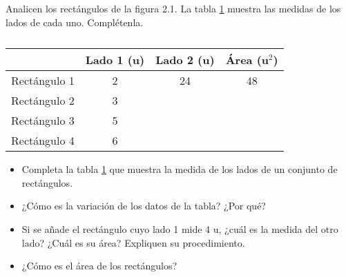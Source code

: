\documentclass{exam-n}
\begin{document}
\begin{questions}
    \question Analicen los rectángulos de la figura 2.1. La tabla \ref{tab:rectangulos} muestra las medidas de los lados de cada uno. Complétenla.
    \begin{table}[!h]
        \label{tab:rectangulos}
        \centering
        \begin{tabular}{|l|c|c|c|}
            \hline
                         & Lado 1 (u) & Lado 2 (u) & Área (u$^2$) \\
            \hline
            Rectángulo 1 & 2          & 24         & 48           \\
            Rectángulo 2 & 3          &            &              \\
            Rectángulo 3 & 5          &            &              \\
            Rectángulo 4 & 6          &            &              \\
            \hline
        \end{tabular}
        \caption{}
    \end{table}
    \begin{itemize}
        \item Completa la tabla \ref{tab:rectangulos} que muestra la medida de los lados de un conjunto de rect\'angulos.
        \item ¿Cómo es la variación de los datos de la tabla? ¿Por qué?
        \item Si se añade el rectángulo cuyo lado 1 mide 4 u, ¿cuál es la medida del otro lado? ¿Cuál es su área? Expliquen su procedimiento.
        \item ¿Cómo es el área de los rectángulos?
    \end{itemize}
\end{questions}
\end{document}
